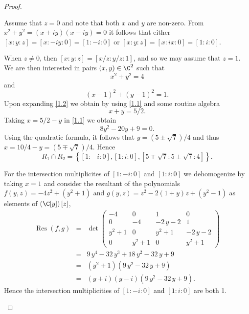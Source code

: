 \documentclass[10pt]{amsart}
\begin{document}
\begin{thm}
\begin{proof}
\begin{enumerate}[(a)]
      Assume that $z = 0$ and note that both $x$ and $y$ are non-zero.
      From $x^2 + y^2 = (x + iy)(x - iy) = 0$ it follows that either $[x : y : z] = [x : -iy : 0] = [1 : -i : 0]$
      or $[x : y : z] = [x : ix : 0] = [1 : i : 0]$.
      
      When $z \neq 0$, then $[x : y : z] = [x/z : y/z : 1]$, and so we may assume that $z = 1$.
      We are then interested in pairs $(x,y) \in \C^2$ such that 
      \begin{equation}\label{1.1}
	x^2 + y^2 = 4
      \end{equation}
      and 
      \begin{equation}\label{1.2}
	(x - 1)^2 + (y-1)^2 = 1.
      \end{equation}
      Upon expanding \eqref{1.2} we obtain by using \eqref{1.1} and some routine algebra 
      $$x + y = 5/2.$$
      Taking $x = 5/2 - y$ in \eqref{1.1} we obtain
      $$8y^2 - 20y + 9 = 0.$$
      Using the quadratic formula, it follows that $y = (5 \pm \sqrt{7})/4$ and thus $x = 10/4 - y = \left(5 \mp \sqrt{7}\right)/4$.
      Hence
      $$R_1 \cap R_2 = \left\{[1 : -i : 0], [1 : i : 0], [5 \mp \sqrt{7} : 5 \pm \sqrt{7} : 4]\right\}.$$

      For the intersection multiplicites of $[1 : -i : 0]$ and $[1 : i : 0]$ we dehomogenize by taking $x = 1$ and consider the resultant of the polynomials $f(y,z) = -4z^2 + (y^2 + 1)$ and $g(y,z) = z^2 - 2(1 + y)z + (y^2 - 1)$ as elements of $\left(\C[y]\right)[z]$, 
      \begin{eqnarray*}
        \operatorname{Res}(f,g) &=& \det\left(\begin{array}{cccc}
        -4 & 0 & 1 & 0 \\
        0 & -4 & -2 \, y - 2 & 1 \\
        y^{2} + 1 & 0 & y^{2} + 1 & -2 \, y - 2 \\
        0 & y^{2} + 1 & 0 & y^{2} + 1
      \end{array}\right)\\
        &=& 9 \, y^{4} - 32 \, y^{3} + 18 \, y^{2} - 32 \, y + 9\\
        &=& {\left(y^{2} + 1\right)} {\left(9 \, y^{2} - 32 \, y + 9\right)}\\
        &=& {\left(y + i\right)} {\left(y - i\right)} {\left(9 \, y^{2} - 32 \, y + 9\right)}.
      \end{eqnarray*}
      Hence the intersection multiplicities of $[1 : -i : 0]$ and $[1 : i : 0]$ are both 1.
      

\end{enumerate}
\end{proof}
\end{thm}
\end{document}
